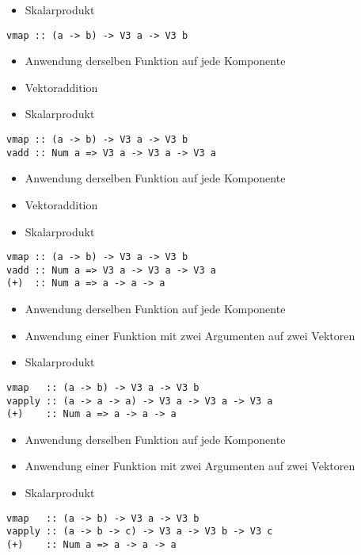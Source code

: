 \documentclass{beamer}
\begin{document}
\begin{frame}[fragile]
\begin{overprint}
\begin{itemize}
 \item Skalarprodukt
\end{itemize}
\begin{verbatim}
vmap :: (a -> b) -> V3 a -> V3 b
\end{verbatim}
\begin{itemize}
 \item Anwendung derselben Funktion auf jede Komponente
 \item Vektoraddition
 \item Skalarprodukt
\end{itemize}
\begin{verbatim}
vmap :: (a -> b) -> V3 a -> V3 b
vadd :: Num a => V3 a -> V3 a -> V3 a
\end{verbatim}
\begin{itemize}
 \item Anwendung derselben Funktion auf jede Komponente
 \item Vektoraddition
 \item Skalarprodukt
\end{itemize}
\begin{verbatim}
vmap :: (a -> b) -> V3 a -> V3 b
vadd :: Num a => V3 a -> V3 a -> V3 a
(+)  :: Num a => a -> a -> a
\end{verbatim}
\begin{itemize}
 \item Anwendung derselben Funktion auf jede Komponente
 \item Anwendung einer Funktion mit zwei Argumenten auf zwei Vektoren
 \item Skalarprodukt
\end{itemize}
\begin{verbatim}
vmap   :: (a -> b) -> V3 a -> V3 b
vapply :: (a -> a -> a) -> V3 a -> V3 a -> V3 a
(+)    :: Num a => a -> a -> a
\end{verbatim}
\begin{itemize}
 \item Anwendung derselben Funktion auf jede Komponente
 \item Anwendung einer Funktion mit zwei Argumenten auf zwei Vektoren
 \item Skalarprodukt
\end{itemize}
\begin{verbatim}
vmap   :: (a -> b) -> V3 a -> V3 b
vapply :: (a -> b -> c) -> V3 a -> V3 b -> V3 c
(+)    :: Num a => a -> a -> a
\end{verbatim}

\end{overprint}
\end{frame}
\end{document}
